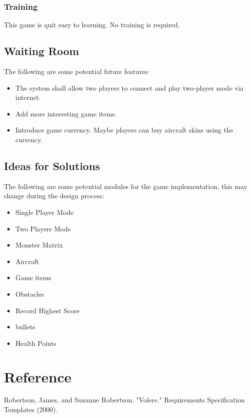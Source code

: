 \documentclass[12pt]{article}
\begin{document}
\subsubsection{Training}
This game is quit easy to learning. No training is required.
\subsection{Waiting Room}
The following are some potential future features:
\begin{itemize}
\item  The system shall allow two players to connect and play
two-player mode via internet.
\item Add more interesting game items.
\item Introduce game currency. Maybe players can buy aircraft
skins using the currency.  
\end{itemize}
\subsection{Ideas for Solutions}
The following are some potential modules for the game 
implementation, this may change during the design process:
\begin{itemize}
\item Single Player Mode
\item Two Players Mode
\item Monster Matrix
\item Aircraft
\item Game items
\item Obstacles
\item Record Highest Score
\item bullets
\item Health Points
\end{itemize}
\section{Reference}
Robertson, James, and Suzanne Robertson. "Volere." Requirements Specification Templates (2000).
\end{document}
